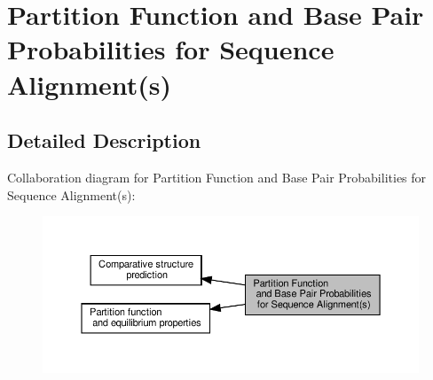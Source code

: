 \hypertarget{group__consensus__pf__fold}{}\section{Partition Function and Base Pair Probabilities for Sequence Alignment(s)}
\label{group__consensus__pf__fold}


\subsection{Detailed Description}
Collaboration diagram for Partition Function and Base Pair Probabilities for Sequence Alignment(s)\+:
\nopagebreak
\begin{figure}[H]
\begin{center}
\leavevmode
\includegraphics[width=350pt]{group__consensus__pf__fold}
\end{center}
\end{figure}
